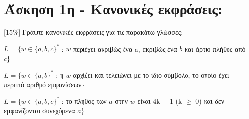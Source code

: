 \section{Άσκηση 1η - Κανονικές εκφράσεις:}
\label{sec:Exercise_1}
\doublespacing

[15\%] Γράψτε κανονικές εκφράσεις για τις παρακάτω γλώσσες:

\bm{\textcolor{blue}{(α)}} $L = \{w \in \{a, b, c\}^{*}$ : $w$ περιέχει ακριβώς ένα
a, ακριβώς ένα $b$ και άρτιο πλήθος από $c$\}

\bm{\textcolor{blue}{(β)}} $L = \{w \in \{a, b\}^{*}$ : η $w$ αρχίζει και τελειώνει με
το ίδιο σύμβολο, το οποίο έχει περιττό αριθμό εμφανίσεων\}

\bm{\textcolor{blue}{(γ)}} $L = \{w \in \{a, b, c\}^{*}$ : το πλήθος των $a$ στην $w$
είναι 4k + 1 (k $\geq$ 0) και δεν εμφανίζονται συνεχόμενα $a$\}
\clearpage
